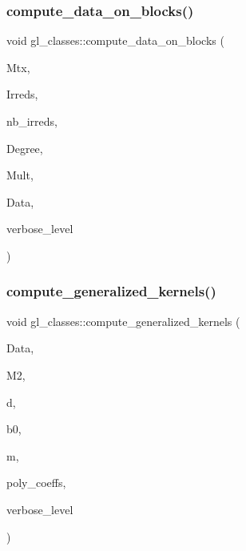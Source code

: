 \subsubsection{\texorpdfstring{compute\+\_\+data\+\_\+on\+\_\+blocks()}{compute\_data\_on\_blocks()}}
{\footnotesize\ttfamily void gl\+\_\+classes\+::compute\+\_\+data\+\_\+on\+\_\+blocks (\begin{DoxyParamCaption}\item[{\mbox{\hyperlink{galois_8h_a09fddde158a3a20bd2dcadb609de11dc}{I\+NT}} $\ast$}]{Mtx,  }\item[{\mbox{\hyperlink{galois_8h_a09fddde158a3a20bd2dcadb609de11dc}{I\+NT}} $\ast$}]{Irreds,  }\item[{\mbox{\hyperlink{galois_8h_a09fddde158a3a20bd2dcadb609de11dc}{I\+NT}}}]{nb\+\_\+irreds,  }\item[{\mbox{\hyperlink{galois_8h_a09fddde158a3a20bd2dcadb609de11dc}{I\+NT}} $\ast$}]{Degree,  }\item[{\mbox{\hyperlink{galois_8h_a09fddde158a3a20bd2dcadb609de11dc}{I\+NT}} $\ast$}]{Mult,  }\item[{\mbox{\hyperlink{classmatrix__block__data}{matrix\+\_\+block\+\_\+data}} $\ast$}]{Data,  }\item[{\mbox{\hyperlink{galois_8h_a09fddde158a3a20bd2dcadb609de11dc}{I\+NT}}}]{verbose\+\_\+level }\end{DoxyParamCaption})}

\mbox{\label{classgl__classes_a040676a8d8735aeb12becc3214d106a2}} 
\subsubsection{\texorpdfstring{compute\+\_\+generalized\+\_\+kernels()}{compute\_generalized\_kernels()}}
{\footnotesize\ttfamily void gl\+\_\+classes\+::compute\+\_\+generalized\+\_\+kernels (\begin{DoxyParamCaption}\item[{\mbox{\hyperlink{classmatrix__block__data}{matrix\+\_\+block\+\_\+data}} $\ast$}]{Data,  }\item[{\mbox{\hyperlink{galois_8h_a09fddde158a3a20bd2dcadb609de11dc}{I\+NT}} $\ast$}]{M2,  }\item[{\mbox{\hyperlink{galois_8h_a09fddde158a3a20bd2dcadb609de11dc}{I\+NT}}}]{d,  }\item[{\mbox{\hyperlink{galois_8h_a09fddde158a3a20bd2dcadb609de11dc}{I\+NT}}}]{b0,  }\item[{\mbox{\hyperlink{galois_8h_a09fddde158a3a20bd2dcadb609de11dc}{I\+NT}}}]{m,  }\item[{\mbox{\hyperlink{galois_8h_a09fddde158a3a20bd2dcadb609de11dc}{I\+NT}} $\ast$}]{poly\+\_\+coeffs,  }\item[{\mbox{\hyperlink{galois_8h_a09fddde158a3a20bd2dcadb609de11dc}{I\+NT}}}]{verbose\+\_\+level }\end{DoxyParamCaption})}

